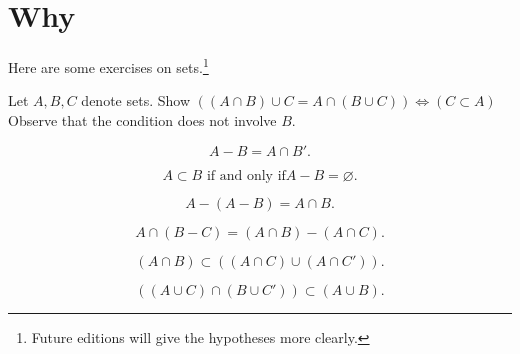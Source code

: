 

\section*{Why}

Here are some exercises on sets.\footnote{Future editions will give the hypotheses more clearly.}

\begin{exercise}
Let $A, B, C$ denote sets.
Show $((A \cap  B) \cup C = A \cap  (B \cup C)) \iff (C \subset A)$
Observe that the condition does not involve $B$.
\end{exercise}

\begin{exercise}
\[
A - B = A \cap  B'.
\]
\end{exercise}

\begin{exercise}
\[
A \subset B \text{ if and only if} A - B = \varnothing.
\]
\end{exercise}

\begin{exercise}
\[
A - (A - B) = A \cap  B.
\]
\end{exercise}

\begin{exercise}
\[
A \cap  (B - C) = (A \cap  B) - (A \cap  C).
\]
\end{exercise}

\begin{exercise}
\[
(A \cap  B) \subset ((A \cap  C) \cup (A \cap  C')).
\]
\end{exercise}

\begin{exercise}
\[
((A \cup C) \cap  (B \cup C')) \subset (A \cup B).
\]
\end{exercise}

\blankpage
